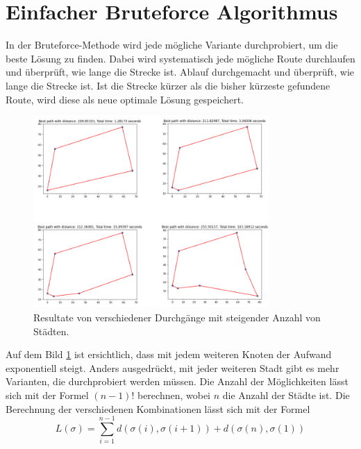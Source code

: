 %
%
%
%
\section{Einfacher Bruteforce Algorithmus
  \label{buch:paper:varalg:section:bruteforce}}
In der Bruteforce-Methode wird jede mögliche Variante durchprobiert,
um die beste Lösung zu finden. Dabei wird systematisch jede mögliche
Route durchlaufen und überprüft, wie lange die Strecke ist.
Ablauf durchgemacht und überprüft, wie lange die Strecke ist.
Ist die Strecke kürzer als die bisher kürzeste gefundene Route,
wird diese als neue optimale Lösung gespeichert.
\begin{figure}
    \centering
    \includegraphics[width=0.8\textwidth]{papers/varalg/images/teil2/02BruteforceMethode.png}
    \caption{Resultate von verschiedener Durchgänge mit steigender Anzahl von Städten.
        \label{fig:results_bruteforce}}
\end{figure}
Auf dem Bild \ref{fig:results_bruteforce} ist ersichtlich, dass mit
jedem weiteren Knoten der Aufwand exponentiell steigt. Anders
ausgedrückt, mit jeder weiteren Stadt gibt es mehr Varianten, die
durchprobiert werden müssen. Die Anzahl der Möglichkeiten lässt sich
mit der Formel \((n-1)!\) berechnen, wobei \(n\) die Anzahl der Städte ist.
Die Berechnung der verschiedenen Kombinationen lässt sich mit der
Formel
\begin{equation}
    L(\sigma)
    =
    \sum_{i=1}^{n-1} d(\sigma(i), \sigma(i+1)) + d(\sigma(n), \sigma(1))
    \label{eq:bruteforce_min_formula}
\end{equation}

